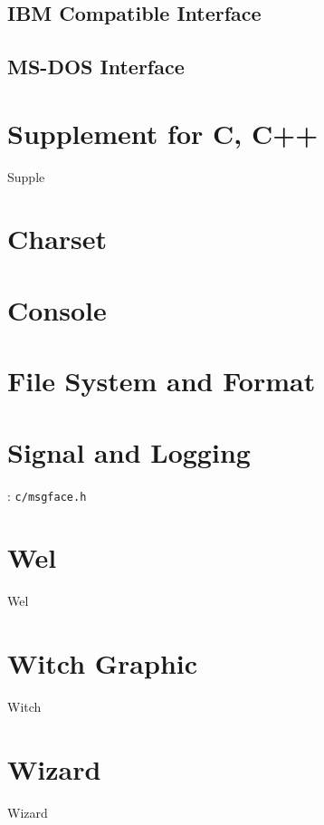 
\subsection{IBM Compatible Interface}

\subsection{MS-DOS Interface}

\section{Supplement for C, C++}
{Supple}

\section{Charset}


\section{Console}


\section{File System and Format}


\section{Signal and Logging}

: \verb`c/msgface.h`





\section{Wel}
{Wel}

\section{Witch Graphic} 
{Witch}

\section{Wizard}
{Wizard}

